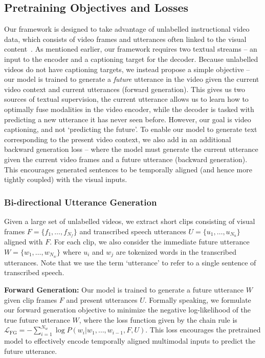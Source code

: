 \documentclass[10pt,twocolumn,letterpaper]{article}
\begin{document}
 
\subsection{Pretraining Objectives and Losses} 
Our framework is designed to take advantage of unlabelled instructional video data, which consists of video frames and utterances often linked to the visual content~\cite{miech2019howto100m}.
As mentioned earlier, our framework requires two textual streams -- an input to the encoder and a captioning target for the decoder. Because unlabelled videos do not have captioning targets, 
we instead propose a simple objective -- our model is trained to generate a \textit{future} utterance in the video given the current video context and current utterances (forward generation). This gives us two sources of textual supervision, the current utterance allows us to learn how to optimally fuse modalities in the video encoder, while the decoder is tasked with predicting a new utterance it has never seen before. However, our goal is video captioning, and not `predicting the future'. 
To enable our model to generate text corresponding to the present video context, we also add in an additional backward generation loss -- where the model must generate the current utterance given the current video frames and a future utterance (backward generation). This encourages generated sentences to be temporally aligned (and hence more tightly coupled) with the visual inputs.



\subsubsection{Bi-directional Utterance Generation} 
Given a large set of unlabelled videos, we extract short clips consisting of visual frames $F=\{f_1,\dots,f_{N_f}\}$ and transcribed speech utterances $U=\{u_1,\dots,u_{N_u}\}$ aligned with $F$. For each clip, we also consider the immediate future utterance $W=\{w_1,\dots,w_{N_w}\}$ where $u_i$ and $w_j$ are tokenized words in the transcribed utterances. 
Note that we use the term `utterance' to refer to a single sentence of transcribed speech. 
	
\noindent\textbf{Forward Generation:}
Our model is trained to generate a future utterance $W$ given clip frames $F$ and present utterances $U$.
Formally speaking, we formulate our forward generation objective to minimize the negative log-likelihood of the true future utterance $W$, where the loss function given by the chain rule is $\mathcal{L}_\mathrm{FG}=-\sum_{i=1}^{N_w}{\log P(w_i|w_1,\dots,w_{i-1}, F, U)}$.
This loss encourages the pretrained model to effectively encode temporally aligned multimodal inputs to predict the future utterance.
\end{document}
